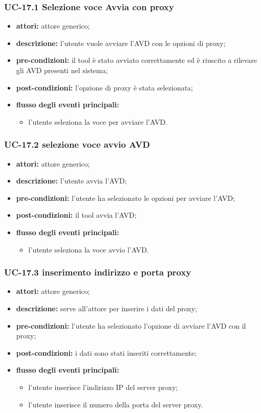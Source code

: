 \subsubsection*{UC-17.1 Selezione voce Avvia con proxy}
\begin{itemize}
    \item \textbf{attori:} attore generico;
    \item \textbf{descrizione:} l'utente vuole avviare l'AVD con le opzioni di proxy;
    \item \textbf{pre-condizioni:} il tool è stato avviato correttamente ed è riuscito a rilevare gli AVD presenti nel sistema;
    \item \textbf{post-condizioni:} l'opzione di proxy è stata selezionata;
    \item \textbf{flusso degli eventi principali:}
    \begin{itemize}
        \item l'utente seleziona la voce per avviare l'AVD.
    \end{itemize}
\end{itemize}
\subsubsection*{UC-17.2 selezione voce avvio AVD}
\begin{itemize}
    \item \textbf{attori:} attore generico;
    \item \textbf{descrizione:} l'utente avvia l'AVD;
    \item \textbf{pre-condizioni:} l'utente ha selezionato le opzioni per avviare l'AVD;
    \item \textbf{post-condizioni:} il tool avvia l'AVD;
    \item \textbf{flusso degli eventi principali:}
    \begin{itemize}
        \item l'utente seleziona la voce avvio l'AVD.
    \end{itemize}
\end{itemize}
\subsubsection*{UC-17.3 inserimento indirizzo e porta proxy}
\begin{itemize}
    \item \textbf{attori:} attore generico;
    \item \textbf{descrizione:} serve all'attore per inserire i dati del proxy;
    \item \textbf{pre-condizioni:} l'utente ha selezionato l'opzione di avviare l'AVD con il proxy;
    \item \textbf{post-condizioni:} i dati sono stati inseriti correttamente;
    \item \textbf{flusso degli eventi principali:}
    \begin{itemize}
        \item l'utente inserisce l'indirizzo IP del server proxy;
        \item l'utente inserisce il numero della porta del server proxy.
    \end{itemize}
\end{itemize}
